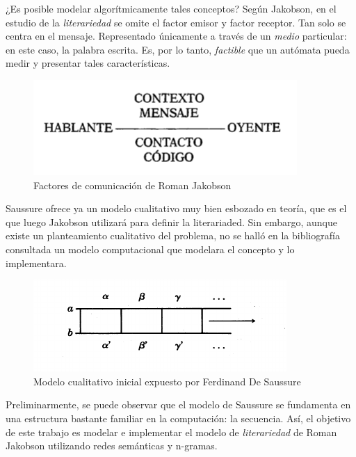 \documentclass[twoside]{article}
\begin{document}
¿Es posible  modelar algorítmicamente  tales conceptos? Según
Jakobson, en el estudio de la \emph{literariedad} se omite el factor emisor
y factor receptor. Tan solo se centra en el mensaje. Representado
 únicamente a través de un \emph{medio} particular: en este caso, la palabra escrita.
Es, por lo tanto,  \emph{factible} que un autómata pueda medir y presentar tales
características. 

\begin{figure}[htbp]
\centering
\includegraphics[width=.9\linewidth]{./assets/factores_comunicacion.png}
\caption{Factores de comunicación de Roman Jakobson}
\end{figure}

Saussure ofrece ya un modelo cualitativo muy bien esbozado en teoría,
que es el que luego Jakobson utilizará para definir la literariaded.
Sin embargo, aunque existe un planteamiento cualitativo del problema,
no se halló en la bibliografía consultada un modelo computacional que
modelara el concepto y lo implementara. 

\begin{figure}[htbp]
\centering
\includegraphics[width=.9\linewidth]{./assets/delimitacion_saussure.png}
\caption{Modelo cualitativo inicial expuesto por Ferdinand De Saussure}
\end{figure}

Preliminarmente, se puede observar que el modelo de Saussure se
fundamenta en una estructura bastante familiar en la computación: la
secuencia. Así, el objetivo de este trabajo es modelar e implementar el
modelo de \emph{literariedad} de Roman Jakobson utilizando redes semánticas
y n-gramas.
\end{document}
